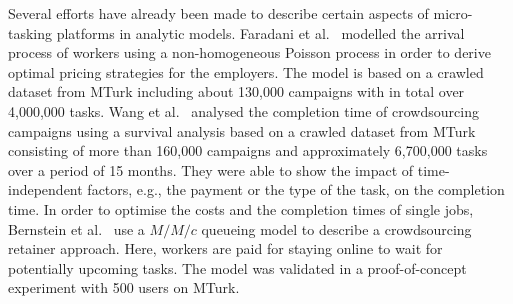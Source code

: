 Several efforts have already been made to describe certain aspects of micro-tasking platforms in analytic models.
Faradani et al.~\cite{Faradani2011} modelled the arrival process of workers using a non-homogeneous Poisson process in order to derive optimal pricing strategies for the employers.
The model is based on a crawled dataset from MTurk including about 130,000 campaigns with in total over 4,000,000 tasks.
Wang et al.~\cite{Wang2011} analysed the completion time of crowdsourcing campaigns using a survival analysis based on a crawled dataset from MTurk consisting of more than 160,000 campaigns and approximately 6,700,000 tasks over a period of 15 months.
They were able to show the impact of time-independent factors, e.g., the payment or the type of the task, on the completion time.
In order to optimise the costs and the completion times of single jobs, Bernstein et al.~\cite{Bernstein2012} use a \(M/M/c\) queueing model to describe a crowdsourcing retainer approach.
Here, workers are paid for staying online to wait for potentially upcoming tasks.
The model was validated in a proof-of-concept experiment with 500 users on MTurk.
